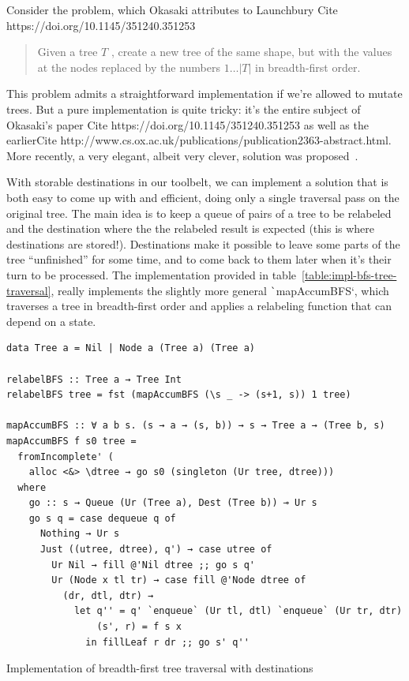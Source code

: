 \documentclass[english]{jflart}
\newcommand{\TODO}[1]{{\color{red}\large #1}}
\begin{document}
Consider the problem, which Okasaki attributes to Launchbury \TODO{Cite https://doi.org/10.1145/351240.351253}
\begin{quote}
  Given a tree $T$ , create a new tree of the same
  shape, but with the values at the nodes replaced
  by the numbers $1\ldots|T|$ in breadth-first order.
\end{quote}

This problem admits a straightforward implementation if we're allowed to mutate trees. But a pure implementation is quite tricky: it's the entire subject of Okasaki's paper \TODO{Cite https://doi.org/10.1145/351240.351253} as well as the earlier\TODO{Cite http://www.cs.ox.ac.uk/publications/publication2363-abstract.html}. More recently, a very elegant, albeit very clever, solution was proposed~\cite{gibbons_phases_2023}.

With storable destinations in our toolbelt, we can implement a solution that is both easy to come up with and efficient, doing only a single traversal pass on the original tree. The main idea is to keep a queue of pairs of a tree to be relabeled and the destination where the the relabeled result is expected (this is where destinations are stored!). Destinations make it possible to leave some parts of the tree ``unfinished'' for some time, and to come back to them later when it's their turn to be processed. The implementation provided in table~\ref{table:impl-bfs-tree-traversal}, really implements the slightly more general \texttt`mapAccumBFS`, which traverses a tree in breadth-first order and applies a relabeling function that can depend on a state.

\begin{table}[t]
\small
\begin{verbatim}
data Tree a = Nil | Node a (Tree a) (Tree a)

relabelBFS :: Tree a → Tree Int
relabelBFS tree = fst (mapAccumBFS (\s _ -> (s+1, s)) 1 tree)

mapAccumBFS :: ∀ a b s. (s → a → (s, b)) → s → Tree a → (Tree b, s)
mapAccumBFS f s0 tree =
  fromIncomplete' (
    alloc <&> \dtree → go s0 (singleton (Ur tree, dtree)))
  where
    go :: s → Queue (Ur (Tree a), Dest (Tree b)) ⊸ Ur s
    go s q = case dequeue q of
      Nothing → Ur s
      Just ((utree, dtree), q') → case utree of
        Ur Nil → fill @'Nil dtree ;; go s q'
        Ur (Node x tl tr) → case fill @'Node dtree of
          (dr, dtl, dtr) →
            let q'' = q' `enqueue` (Ur tl, dtl) `enqueue` (Ur tr, dtr)
                (s', r) = f s x
              in fillLeaf r dr ;; go s' q''
\end{verbatim}
\caption{Implementation of breadth-first tree traversal with destinations}
\label{table:impl-bfs-tree-traversal}
\end{table}
\end{document}
